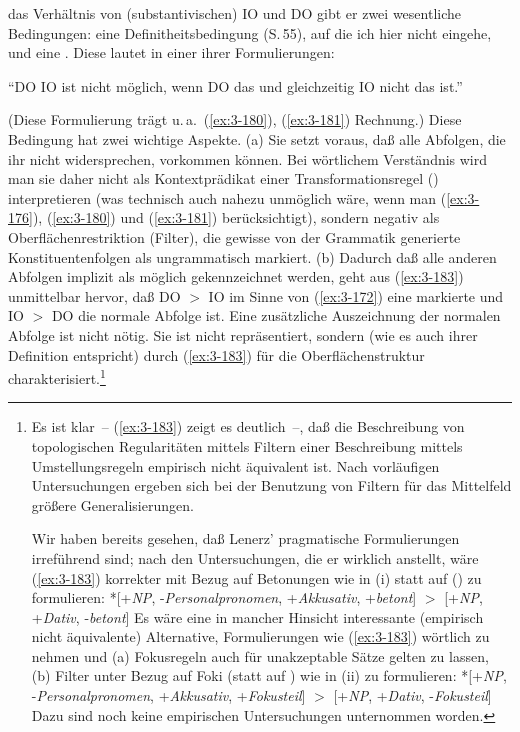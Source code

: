 \documentclass[output=paper]{langsci/langscibook}
\begin{document}
das Verhältnis von (substantivischen) IO und DO gibt er zwei
wesentliche Bedingungen: eine Definitheitsbedingung (S.\,55), auf die
ich hier nicht eingehe, und eine . Diese
lautet in einer ihrer Formulierungen:
\begin{exe}
\ex \label{ex:3-183}
"`DO IO ist nicht möglich, wenn DO das  und gleichzeitig IO nicht
das  ist."' \citep[44 (4c)]{Lenerz77}
\end{exe}
\addlines[2]
(Diese Formulierung trägt u.\,a.\ (\ref{ex:3-180}), (\ref{ex:3-181}) Rechnung.) Diese
Bedingung hat zwei wichtige Aspekte. (a) Sie setzt voraus, daß alle Abfolgen, die ihr nicht widersprechen, vorkommen können. Bei wörtlichem Verständnis wird man sie daher nicht als Kontextprädikat einer Transformationsregel () interpretieren (was technisch auch nahezu unmöglich wäre, wenn man (\ref{ex:3-176}), (\ref{ex:3-180}) und (\ref{ex:3-181})
berücksichtigt), sondern negativ als Oberflächenrestriktion (Filter), die gewisse von der Grammatik generierte Konstituentenfolgen als ungrammatisch markiert. (b) Dadurch daß alle anderen Abfolgen implizit als möglich gekennzeichnet werden, geht aus (\ref{ex:3-183}) unmittelbar hervor,
daß DO $>$ IO im Sinne von (\ref{ex:3-172}) eine markierte und IO $>$ DO die normale
Abfolge ist. Eine zusätzliche Auszeichnung der normalen Abfolge ist nicht nötig. Sie ist nicht  repräsentiert, sondern (wie es auch ihrer Definition entspricht) durch (\ref{ex:3-183}) für die Oberflächenstruktur charakterisiert.\footnote{\label{fn:3-34}%
	Es ist klar~-- (\ref{ex:3-183}) zeigt es deutlich~--, daß die Beschreibung von  topologischen Regularitäten mittels Filtern einer Beschreibung mittels Umstellungsregeln empirisch nicht äquivalent ist. Nach vorläufigen Untersuchungen ergeben sich bei der Benutzung von Filtern für das Mittelfeld größere Generalisierungen.

  Wir haben bereits gesehen, daß Lenerz' pragmatische Formulierungen
  irreführend sind; nach den Untersuchungen, die er wirklich anstellt,
  wäre (\ref{ex:3-183}) korrekter mit Bezug auf Betonungen wie in (i) statt auf
   () zu formulieren:
  \ea
  \label{ex:3-fn34i}
  *[+\textit{NP}, -\textit{Personalpronomen}, +\textit{Akkusativ}, +\textit{betont}] $>$ [+\textit{NP}, +\textit{Dativ}, -\textit{betont}]
  \z
  Es wäre eine in mancher Hinsicht interessante (empirisch nicht
  äquivalente) Alternative, Formulierungen wie (\ref{ex:3-183}) wörtlich zu nehmen
  und (a) Fokusregeln auch für unakzeptable Sätze gelten zu lassen, (b)
  Filter unter Bezug auf Foki (statt auf ) wie in (ii) zu
  formulieren:
  \ea
  \label{ex:3-fn34ii}
  *[+\textit{NP}, -\textit{Personalpronomen}, +\textit{Akkusativ}, +\textit{Fokusteil}] $>$ [+\textit{NP}, +\textit{Dativ}, -\textit{Fokusteil}]
  \z
  Dazu sind noch keine empirischen Untersuchungen unternommen worden.%
}
\end{document}
